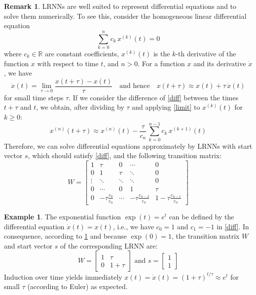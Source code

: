 \documentclass[twoside,11pt]{article}
\theoremstyle{definition}
\newtheorem{exmp}{Example}
\newtheorem{remk}{Remark}
\begin{document}
\begin{remk}\label{rem}
LRNNs are well suited to represent differential equations and to solve them
numerically. To see this, consider the homogeneous linear differential equation
\begin{equation}
	\sum_{k=0}^n c_k\,x^{(k)}(t) = 0 \label{diff}
\end{equation}
where $c_k \in \mathbb{R}$ are constant coefficients, $x^{(k)}(t)$ is the $k$-th
derivative of the function $x$ with respect to time $t$, and $n>0$. For a
function $x$ and its derivative $\dot{x}$, we have
\begin{equation}
  \dot{x}(t) = \lim\limits_{\tau \to 0} \frac{x(t+\tau)-x(t)}{\tau}
	\quad\textrm{and hence}\quad
  x(t+\tau) \approx x(t) + \tau\,\dot{x}(t) \label{limit}
\end{equation}
for small time steps $\tau$. If we consider the difference of \cref{diff}
between the times $t+\tau$ and $t$, we obtain, after dividing by $\tau$ and
applying \cref{limit} to $x^{(k)}(t)$ for $k \ge 0$:
\[
	x^{(n)}(t+\tau)
	\approx x^{(n)}(t) - \frac{\tau}{c_n}\,\sum_{k=0}^{n-1} c_k\,x^{(k+1)}(t)
\]
Therefore, we can solve differential equations approximately by LRNNs with
start vector $s$, which should satisfy \cref{diff}, and the following transition
matrix:
\[ W = \left[ \begin{array}{*{5}{c}}
	1 & \tau & 0 & \cdots & 0\\
	0 & 1 & \tau & \ddots & 0\\
	\vdots & \ddots & \ddots & \ddots & 0\\
	0 & \cdots & 0 & 1 & \tau\\
	0 & -\tau \frac{c_0}{c_n} & \cdots & -\tau \frac{c_{n-2}}{c_n} & 1\!-\!\tau \frac{c_{n-1}}{c_n}
\end{array} \right] \]
\end{remk}

\begin{exmp}
The exponential function $\exp(t) = e^t$ can be defined by the differential
equation $\dot{x}(t) = x(t)$, i.e., we have $c_0 = 1$ and $c_1 = -1$ in
\cref{diff}. In consequence, according to \cref{rem} and because $\exp(0)=1$,
the transition matrix $W$ and start vector $s$ of the corresponding LRNN are:
\[ W = \left[ \begin{array}{cc}
	1 & \tau\\
	0 & 1\!+\!\tau
   \end{array} \right]
   \textrm{~and~} s = \left[ \begin{array}{c}
	1\\
	1
   \end{array} \right]
\]
Induction over time yields immediately $x(t) = \dot{x}(t) = (1+\tau)^{t/\tau}
\approx e^t$ for small $\tau$ (according to Euler) as expected.
\end{exmp}
\end{document}
